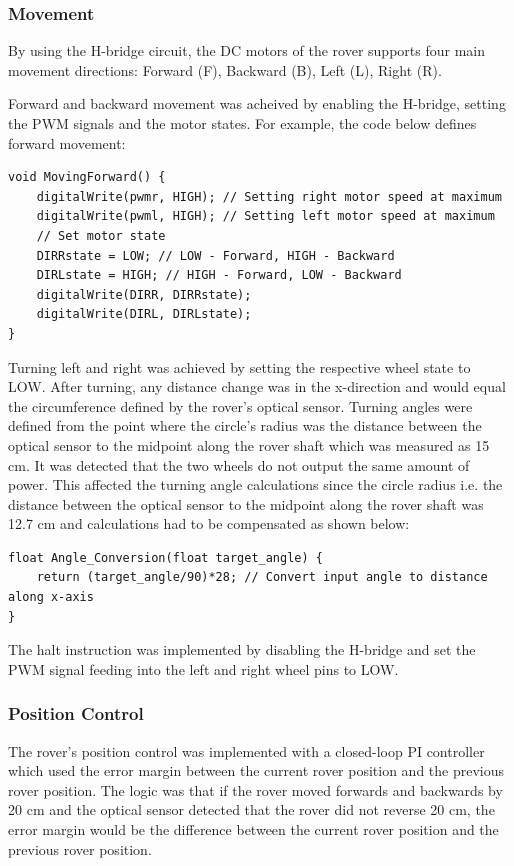 \documentclass[11pt, a4paper]{article}
\begin{document}
\subsubsection{Movement}

By using the H-bridge circuit, the DC motors of the rover supports four main movement directions: Forward (F), Backward (B), Left (L), Right (R). 

Forward and backward movement was acheived by enabling the H-bridge, setting the PWM signals and the motor states. For example, the code below defines forward movement: 

\begin{lstlisting}
void MovingForward() {
    digitalWrite(pwmr, HIGH); // Setting right motor speed at maximum 
    digitalWrite(pwml, HIGH); // Setting left motor speed at maximum 
    // Set motor state 
    DIRRstate = LOW; // LOW - Forward, HIGH - Backward
    DIRLstate = HIGH; // HIGH - Forward, LOW - Backward
    digitalWrite(DIRR, DIRRstate); 
    digitalWrite(DIRL, DIRLstate); 
} 
\end{lstlisting}

Turning left and right was achieved by setting the respective wheel state to LOW. After turning, any distance change was in the x-direction and would equal the circumference defined by the rover's optical sensor. Turning angles were defined from the point where the circle's radius was the distance between the optical sensor to the midpoint along the rover shaft which was measured as 15 cm. It was detected that the two wheels do not output the same amount of power. This affected the turning angle calculations since the circle radius i.e. the distance between the optical sensor to the midpoint along the rover shaft was 12.7 cm and calculations had to be compensated as shown below:

\begin{lstlisting}
float Angle_Conversion(float target_angle) {
    return (target_angle/90)*28; // Convert input angle to distance along x-axis
} 
\end{lstlisting}

The halt instruction was implemented by disabling the H-bridge and set the PWM signal feeding into the left and right wheel pins to LOW.

\subsubsection{Position Control}

The rover's position control was implemented with a closed-loop PI controller which used the error margin between the current rover position and the previous rover position. The logic was that if the rover moved forwards and backwards by 20 cm and the optical sensor detected that the rover did not reverse 20 cm, the error margin would be the difference between the current rover position and the previous rover position.  
\end{document}
